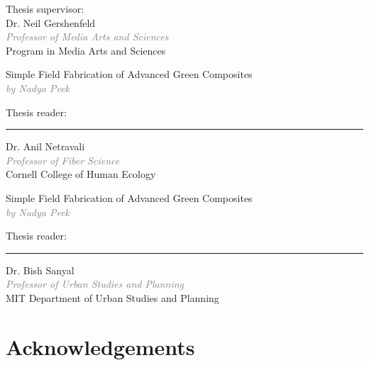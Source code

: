 \documentclass[]{report}
\renewcommand{\emph}[1]{\textit{\textcolor{grey}{#1}}}
\begin{document}
\vspace{20px}
\large{
Thesis supervisor:\\
Dr. Neil Gershenfeld\\
\emph{Professor of Media Arts and Sciences}\\
Program in Media Arts and Sciences\\
}
\pagebreak

\Large{
Simple Field Fabrication of Advanced Green Composites  \vspace{10px} \\ 
\emph{by Nadya Peek}} \vspace{10px} \\

\normalsize{Thesis reader:\\
\hrule \vspace{10px}
\begin{flushright}
Dr. Anil Netravali\\
\emph{Professor of Fiber Science}\\
Cornell College of Human Ecology\\ \vspace{10px}
\end{flushright}
}


\pagebreak


\Large{
Simple Field Fabrication of Advanced Green Composites  \vspace{10px} \\ 
\emph{by Nadya Peek}}\vspace{10px} \\ \vspace{20px}

\normalsize{Thesis reader:\\
\hrule \vspace{10px}
\begin{flushright}
Dr. Bish Sanyal\\
\emph{Professor of Urban Studies and Planning}\\
MIT Department of Urban Studies and Planning\\ 
\end{flushright}
}

\pagebreak

\normalsize{
\section*{Acknowledgements}
}

\tableofcontents
\end{document}

